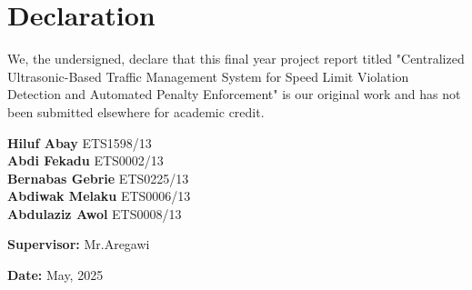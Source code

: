 \section*{Declaration}  %

We, the undersigned, declare that this final year project report titled "Centralized Ultrasonic-Based
Traffic Management System for
Speed Limit Violation Detection and
Automated Penalty Enforcement" is our original work and has not been submitted elsewhere for academic credit.

\vspace{1cm}
\noindent \textbf{Hiluf Abay} \hfill ETS1598/13  \\
\textbf{Abdi Fekadu} \hfill ETS0002/13  \\
\textbf{Bernabas Gebrie} \hfill ETS0225/13  \\
\textbf{Abdiwak Melaku} \hfill ETS0006/13  \\
\textbf{Abdulaziz Awol} \hfill ETS0008/13  

\vspace{1cm}
\noindent \textbf{Supervisor:} Mr.Aregawi

\vspace{1cm}
\noindent \textbf{Date:} May, 2025  
